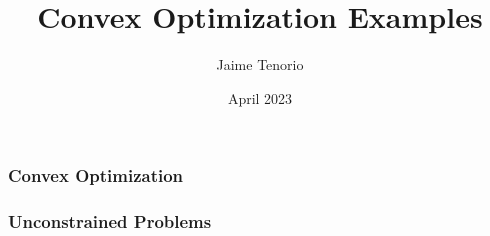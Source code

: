\documentclass{beamer}
\title{Convex Optimization Examples}
\author{Jaime Tenorio}
\date{April 2023}
\begin{document}
\maketitle

\begin{frame}
    \frametitle{Convex Optimization}
    
\end{frame}

\begin{frame}
        
\end{frame}

\begin{frame}
    \frametitle{Unconstrained Problems}
    
\end{frame}

\begin{frame}
    
\end{frame}
\end{document}
